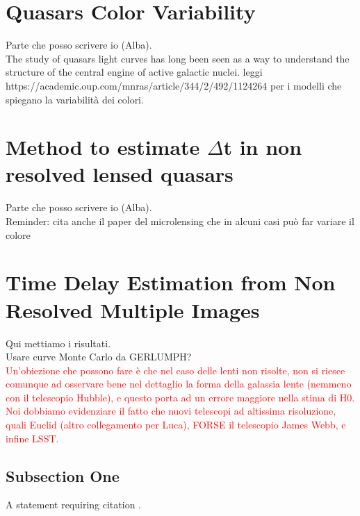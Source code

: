 \documentclass[twoside,twocolumn]{article}
\begin{document}
\section{Quasars Color Variability}
Parte che posso scrivere io (Alba).
\\
The study of quasars light curves has long been seen as a way to understand the structure of the central engine of active galactic nuclei.
leggi https://academic.oup.com/mnras/article/344/2/492/1124264 per i modelli che spiegano la variabilità dei colori.


\section{Method to estimate $\Delta$t in non resolved lensed quasars}
Parte che posso scrivere io (Alba).
\\
Reminder: cita anche il paper del microlensing che in alcuni casi può far variare il colore

\section{Time Delay Estimation from Non Resolved Multiple Images}

Qui mettiamo i risultati.
\\
Usare curve Monte Carlo da GERLUMPH?
\\
\textcolor{red}{Un'obiezione che possono fare è che nel caso delle lenti non risolte, non si riesce comunque ad osservare bene nel dettaglio la forma della galassia lente (nemmeno con il telescopio Hubble), e questo porta ad un errore maggiore nella stima di H0. Noi dobbiamo evidenziare il fatto che nuovi telescopi ad altissima risoluzione, quali Euclid (altro collegamento per Luca), FORSE il telescopio James Webb, e infine LSST.}


\subsection{Subsection One}

A statement requiring citation \cite{Figueredo:2009dg}.



\nocite{*}
\onecolumn{\printbibliography}
\end{document}
